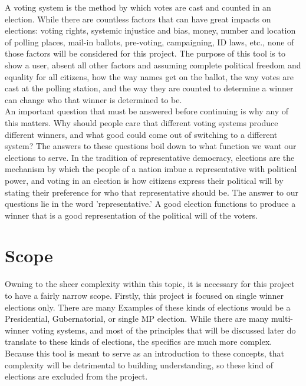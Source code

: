 \documentclass[12pt]{article}
\begin{document}
\qquad A voting system is the method by which votes are cast and counted in an election. While there are countless factors that can have great impacts on elections: voting rights, systemic injustice and bias, money, number and location of polling places, mail-in ballots, pre-voting, campaigning, ID laws, etc., none of those factors will be considered for this project. The purpose of this tool is to show a user, absent all other factors and assuming complete political freedom and equality for all citizens, how the way names get on the ballot, the way votes are cast at the polling station, and the way they are counted to determine a winner can change who that winner is determined to be. \\

\qquad An important question that must be answered before continuing is why any of this matters. Why should people care that different voting systems produce different winners, and what good could come out of switching to a different system? The answers to these questions boil down to what function we want our elections to serve. In the tradition of representative democracy, elections are the mechanism by which the people of a nation imbue a representative with political power, and voting in an election is how citizens express their political will by stating their preference for who that representative should be. The answer to our questions lie in the word 'representative.' A good election functions to produce a winner that is a good representation of the political will of the voters. \\

\section{Scope}
\qquad Owning to the sheer complexity within this topic, it is necessary for this project to have a fairly narrow scope. Firstly, this project is focused on single winner elections only. There are many Examples of these kinds of elections would be a Presidential, Gubernatorial, or single MP election. While there are many multi-winner voting systems, and most of the principles that will be discussed later do translate to these kinds of elections, the specifics are much more complex. Because this tool is meant to serve as an introduction to these concepts, that complexity will be detrimental to building understanding, so these kind of elections are excluded from the project. \\
\end{document}
